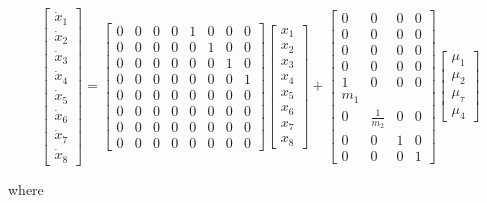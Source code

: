 \documentclass{UoNMCHA}
\numberwithin{equation}{section}
\begin{document}
$$
\left[\begin{array}{c}
\dot{x}_{1} \\
\dot{x}_{2} \\
\dot{x}_{3} \\
\dot{x}_{4} \\
\dot{x}_{5} \\
\dot{x}_{6} \\
\dot{x}_{7} \\
\dot{x}_{8}
\end{array}\right]=\left[\begin{array}{llllllll}
0 & 0 & 0 & 0 & 1 & 0 & 0 & 0 \\
0 & 0 & 0 & 0 & 0 & 1 & 0 & 0 \\
0 & 0 & 0 & 0 & 0 & 0 & 1 & 0 \\
0 & 0 & 0 & 0 & 0 & 0 & 0 & 1 \\
0 & 0 & 0 & 0 & 0 & 0 & 0 & 0 \\
0 & 0 & 0 & 0 & 0 & 0 & 0 & 0 \\
0 & 0 & 0 & 0 & 0 & 0 & 0 & 0 \\
0 & 0 & 0 & 0 & 0 & 0 & 0 & 0
\end{array}\right]\left[\begin{array}{c}
x_{1} \\
x_{2} \\
x_{3} \\
x_{4} \\
x_{5} \\
x_{6} \\
x_{7} \\
x_{8}
\end{array}\right]+\left[\begin{array}{cccc}
0 & 0 & 0 & 0 \\
0 & 0 & 0 & 0 \\
0 & 0 & 0 & 0 \\
0 & 0 & 0 & 0 \\
1 & 0 & 0 & 0 \\
m_{1} & & & \\
0 & \frac{1}{m_{2}} & 0 & 0 \\
0 & 0 & 1 & 0 \\
0 & 0 & 0 & 1
\end{array}\right]\left[\begin{array}{c}
\mu_{1} \\
\mu_{2} \\
\mu_{\tau} \\
\mu_{4}
\end{array}\right]
$$


where 
\end{document}
